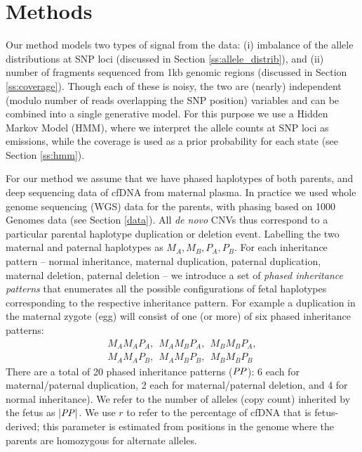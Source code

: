 \section{Methods}
Our method models two types of signal from the data: (i) imbalance of the allele distributions at SNP loci (discussed in Section \ref{ss:allele_distrib}), and (ii) number of fragments sequenced from \ntilde1kb genomic regions (discussed in Section \ref{ss:coverage}). Though each of these is noisy, the two are (nearly) independent (modulo number of reads overlapping the SNP position) variables and can be combined into a single generative model. For this purpose we use a Hidden Markov Model (HMM), where we interpret the allele counts at SNP loci as emissions, while the coverage is used as a prior probability for each state (see Section \ref{ss:hmm}). 

For our method we assume that we have phased haplotypes of both parents, and deep sequencing data of cfDNA from maternal plasma. In practice we used whole genome sequencing (WGS) data for the parents, with phasing based on 1000 Genomes data (see Section \ref{data}). All \textit{de novo} CNVs thus correspond to a particular parental haplotype duplication or deletion event. Labelling the two maternal and paternal haplotypes as $M_A,M_B,P_A,P_B$. For each inheritance pattern -- normal inheritance, maternal duplication, paternal duplication, maternal deletion, paternal deletion -- we introduce a set of \textit{phased inheritance patterns} that enumerates all the possible configurations of fetal haplotypes corresponding to the respective inheritance pattern. For example a duplication in the maternal zygote (egg) will consist of one (or more) 
of  six phased inheritance patterns:
\begin{align*}
M_AM_AP_A, ~~M_AM_BP_A, ~~M_BM_BP_A,\\
M_AM_AP_B, ~~M_AM_BP_B, ~~M_BM_BP_B
\end{align*}
There are a total of 20 phased inheritance patterns ($\mathit{PP}$): 6 each for maternal/paternal duplication, 2 each for maternal/paternal deletion, and 4 for normal inheritance). We refer to the number of alleles (copy count) inherited by the fetus as $|\mathit{PP}|$. We use $r$ to refer to the percentage of cfDNA that is fetus-derived; this parameter is estimated from positions in the genome where the parents are homozygous for alternate alleles.

